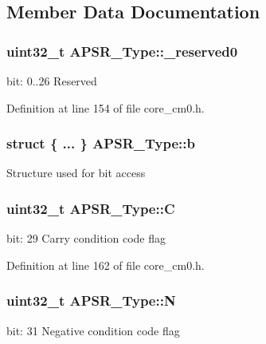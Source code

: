 \subsection{Member Data Documentation}
\subsubsection[{\texorpdfstring{\+\_\+reserved0}{_reserved0}}]{\setlength{\rightskip}{0pt plus 5cm}uint32\+\_\+t A\+P\+S\+R\+\_\+\+Type\+::\+\_\+reserved0}\hypertarget{union_a_p_s_r___type_afbce95646fd514c10aa85ec0a33db728}{}\label{union_a_p_s_r___type_afbce95646fd514c10aa85ec0a33db728}
bit\+: 0..26 Reserved 

Definition at line 154 of file core\+\_\+cm0.\+h.

\subsubsection[{\texorpdfstring{b}{b}}]{\setlength{\rightskip}{0pt plus 5cm}struct \{ ... \}   A\+P\+S\+R\+\_\+\+Type\+::b}\hypertarget{union_a_p_s_r___type_a7dbc79a057ded4b11ca5323fc2d5ab14}{}\label{union_a_p_s_r___type_a7dbc79a057ded4b11ca5323fc2d5ab14}
Structure used for bit access 
\subsubsection[{\texorpdfstring{C}{C}}]{\setlength{\rightskip}{0pt plus 5cm}uint32\+\_\+t A\+P\+S\+R\+\_\+\+Type\+::C}\hypertarget{union_a_p_s_r___type_a86e2c5b891ecef1ab55b1edac0da79a6}{}\label{union_a_p_s_r___type_a86e2c5b891ecef1ab55b1edac0da79a6}
bit\+: 29 Carry condition code flag 

Definition at line 162 of file core\+\_\+cm0.\+h.

\subsubsection[{\texorpdfstring{N}{N}}]{\setlength{\rightskip}{0pt plus 5cm}uint32\+\_\+t A\+P\+S\+R\+\_\+\+Type\+::N}\hypertarget{union_a_p_s_r___type_a7e7bbba9b00b0bb3283dc07f1abe37e0}{}\label{union_a_p_s_r___type_a7e7bbba9b00b0bb3283dc07f1abe37e0}
bit\+: 31 Negative condition code flag 

